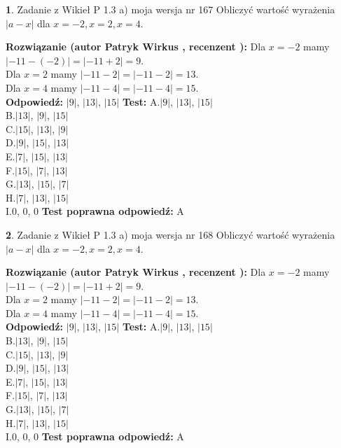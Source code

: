 \documentclass[12pt, a4paper]{article}
\theoremstyle{definition} %
\newtheorem{zad}{}
\newcommand{\zadStart}[1]{\begin{zad}#1\newline}
\newcommand{\zadStop}{\end{zad}}
\newcommand{\rozwStart}[2]{\noindent \textbf{Rozwiązanie (autor #1 , recenzent #2): }\newline}
\newcommand{\rozwStop}{\newline}
\newcommand{\odpStart}{\noindent \textbf{Odpowiedź:}\newline}
\newcommand{\odpStop}{\newline}
\newcommand{\testStart}{\noindent \textbf{Test:}\newline}
\newcommand{\testStop}{\newline}
\newcommand{\kluczStart}{\noindent \textbf{Test poprawna odpowiedź:}\newline}
\newcommand{\kluczStop}{\newline}
\begin{document}
\zadStart{Zadanie z Wikieł P 1.3 a) moja wersja nr 167}
Obliczyć wartość wyrażenia $|a - x|$ dla $x=-2,x=2,x=4$.
\zadStop
\rozwStart{Patryk Wirkus}{}
Dla $x = -2$ mamy $|-11 - (-2)| = |-11 + 2| = 9$.\\
Dla $x = 2$ mamy $|-11 - 2| = |-11 - 2| = 13$.\\
Dla $x = 4$ mamy $|-11 - 4| = |-11 - 4| = 15$.\\
\rozwStop
\odpStart
$|9|$, $|13|$, $|15|$
\odpStop
\testStart
A.$|9|$, $|13|$, $|15|$\\
B.$|13|$, $|9|$, $|15|$\\
C.$|15|$, $|13|$, $|9|$\\
D.$|9|$, $|15|$, $|13|$\\
E.$|7|$, $|15|$, $|13|$\\
F.$|15|$, $|7|$, $|13|$\\
G.$|13|$, $|15|$, $|7|$\\
H.$|7|$, $|13|$, $|15|$\\
I.$0$, $0$, $0$
\testStop
\kluczStart
A
\kluczStop



\zadStart{Zadanie z Wikieł P 1.3 a) moja wersja nr 168}
Obliczyć wartość wyrażenia $|a - x|$ dla $x=-2,x=2,x=4$.
\zadStop
\rozwStart{Patryk Wirkus}{}
Dla $x = -2$ mamy $|-11 - (-2)| = |-11 + 2| = 9$.\\
Dla $x = 2$ mamy $|-11 - 2| = |-11 - 2| = 13$.\\
Dla $x = 4$ mamy $|-11 - 4| = |-11 - 4| = 15$.\\
\rozwStop
\odpStart
$|9|$, $|13|$, $|15|$
\odpStop
\testStart
A.$|9|$, $|13|$, $|15|$\\
B.$|13|$, $|9|$, $|15|$\\
C.$|15|$, $|13|$, $|9|$\\
D.$|9|$, $|15|$, $|13|$\\
E.$|7|$, $|15|$, $|13|$\\
F.$|15|$, $|7|$, $|13|$\\
G.$|13|$, $|15|$, $|7|$\\
H.$|7|$, $|13|$, $|15|$\\
I.$0$, $0$, $0$
\testStop
\kluczStart
A
\kluczStop
\end{document}
